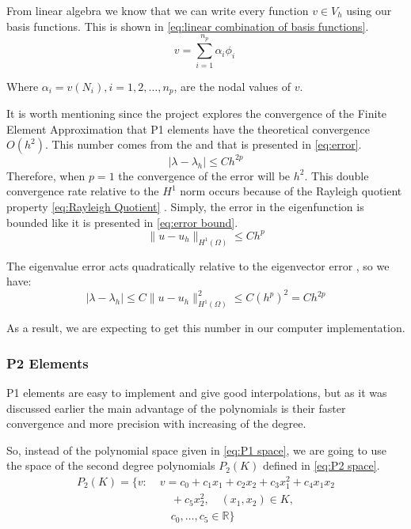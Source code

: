 \documentclass[conference]{IEEEtran}
\begin{document}
From linear algebra we know that we can write every function $v \in V_h$ using our basis functions. This is shown in \ref{eq:linear combination of basis functions}.
\begin{equation}
    v = \sum_{i=1}^{n_p} \alpha_i\phi_i\
    \label{eq:linear combination of basis functions}
\end{equation}

Where $\alpha_i = v(N_i), i = 1, 2, \dots, n_p$, are the nodal values of $v$.

It is worth mentioning since the project explores the convergence of the Finite Element Approximation that P1 elements have the theoretical convergence $O(h^2)$.
This number comes from the \cite{b12.1} and \cite{b12.2} that is presented in \ref{eq:error}.
\begin{equation}
    |\lambda - \lambda_h| \leq Ch^{2p}
    \label{eq:error}
\end{equation}
Therefore, when $p = 1$ the convergence of the error will be $h^2$.
This double convergence rate relative to the $H^1$ norm occurs because of the Rayleigh quotient property \ref{eq:Rayleigh Quotient} \cite{b12.3}. 
Simply, the error in the eigenfunction is bounded like it is presented in \ref{eq:error bound}.
\begin{equation}
    \|u - u_h\|_{H^1(\Omega)} \leq Ch^p 
    \label{eq:error bound}
\end{equation}

The eigenvalue error acts quadratically relative to the eigenvector error \cite{b12.4}, so we have:
\begin{equation}
    |\lambda - \lambda_h| \leq C\|u - u_h\|_{H^1(\Omega)}^2 \leq C(h^p)^2 = Ch^{2p}
\end{equation}

As a result, we are expecting to get this number in our computer implementation.


\subsubsection{P2 Elements}
P1 elements are easy to implement and give good interpolations, but as it was discussed earlier the main advantage of the polynomials is their faster convergence and more precision with increasing of the degree. 

So, instead of the polynomial space given in \ref{eq:P1 space}, we are going to use the space of the second degree polynomials $P_2(K)$ defined in \ref{eq:P2 space}.
\begin{equation}
\begin{aligned}
    P_2(K) = \{v:\;& v = c_0 + c_1x_1 + c_2x_2 + c_3x_1^2 + c_4x_1x_2 \\
    &\quad + c_5x_2^2, \quad (x_1, x_2) \in K, \\
    &\quad c_0, \ldots, c_5 \in \mathbb{R}\}
    \label{eq:P2 space}
\end{aligned}
\end{equation}
\end{document}
